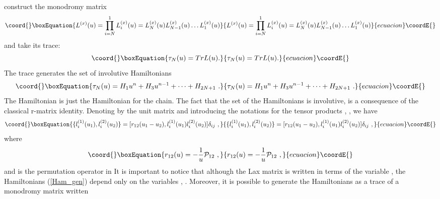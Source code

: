 \documentclass[a4paper,11pt]{article}
\begin{document}
construct the monodromy matrix
\begin{equation}\coord{}\boxEquation{
\label{monoL}
L^{(x)}(u)=\prod_{i=N}^{1} L^{(x)}_i(u)
                   =L^{(x)}_N(u) L^{(x)}_{N-1}(u) \ldots L^{(x)}_1(u)
}{
L^{(x)}(u)=\prod_{i=N}^{1} L^{(x)}_i(u)
                   =L^{(x)}_N(u) L^{(x)}_{N-1}(u) \ldots L^{(x)}_1(u)
}{ecuacion}\coordE{}\end{equation}
and take its trace:
\begin{equation}\coord{}\boxEquation{
\label{monod}
\tau _N(u)=Tr L(u).
}{
\tau _N(u)=Tr L(u).
}{ecuacion}\coordE{}\end{equation}
The trace \coordHE{} generates the set of involutive Hamiltonians
\begin{equation}\coord{}\boxEquation{
\label{Ham_gen}
\tau _N(u)=H_1u^n+H_3u^{n-1}+ \dots +H_{2N+1} ~.
}{
\tau _N(u)=H_1u^n+H_3u^{n-1}+ \dots +H_{2N+1} ~.
}{ecuacion}\coordE{}\end{equation}
The Hamiltonian \coordHE{} is just the Hamiltonian for the chain. The fact that
the set of the Hamiltonians is involutive, is a consequence of the classical
r-matrix identity. Denoting by \coordHE{} the unit \coordHE{} matrix and
introducing the notations for the tensor products \coordHE{},
\coordHE{}, we have
\begin{equation}\coord{}\boxEquation{
\label{r-matrix}
 \{l_i^{(1)}(u_1),l_i^{(2)}(u_2)\}
               =[r_{12}(u_1-u_2),l_i^{(1)}(u_1)l_i^{(2)}(u_2)]\delta_{ij}~,
}{
\{l_i^{(1)}(u_1),l_i^{(2)}(u_2)\}
               =[r_{12}(u_1-u_2),l_i^{(1)}(u_1)l_i^{(2)}(u_2)]\delta_{ij}~,
}{ecuacion}\coordE{}\end{equation}
where
\begin{equation}\coord{}\boxEquation{
\label{r}
r_{12}(u)=-\frac{1}{u}{\cal P}_{12}~,
}{
r_{12}(u)=-\frac{1}{u}{\cal P}_{12}~,
}{ecuacion}\coordE{}\end{equation}
and \coordHE{} is the permutation operator in \coordHE{} It is important to notice that although the Lax matrix is written in
terms of the variable \coordHE{}, the Hamiltonians \coordHE{} (\ref{Ham_gen}) depend
only on the variables \coordHE{}, \coordHE{}. Moreover, it is possible to
generate the Hamiltonians \coordHE{} as a trace of a monodromy matrix written
\end{document}
